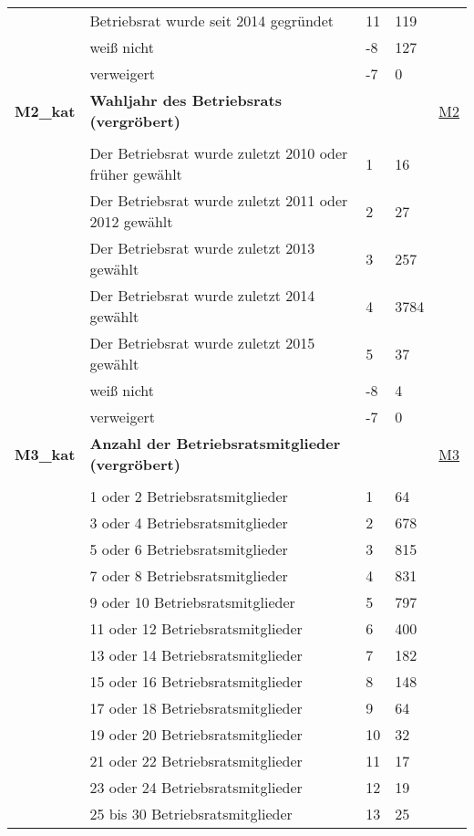 \begin{longtable}{| L{2.5cm} | L{8.25cm}| C{1.5cm} | R{1.25cm} | C{2.25cm} |  }
   & Betriebsrat wurde seit 2014 gegründet & 11 & 119 &  \\ 
   & weiß nicht & -8 & 127 &  \\ 
   & verweigert & -7 & 0 &  \\ 
   \midrule
\textbf{M2\_kat}\label{var:suf:M2:kat} & \textbf{Wahljahr des Betriebsrats (vergröbert)} &  &  & \hyperref[M2]{M2} \\ 
   &  &  &  &  \\ 
   & Der Betriebsrat wurde zuletzt 2010 oder früher gewählt & 1 & 16 &  \\ 
   & Der Betriebsrat wurde zuletzt 2011 oder 2012 gewählt & 2 & 27 &  \\ 
   & Der Betriebsrat wurde zuletzt 2013 gewählt & 3 & 257 &  \\ 
   & Der Betriebsrat wurde zuletzt 2014 gewählt & 4 & 3784 &  \\ 
   & Der Betriebsrat wurde zuletzt 2015 gewählt & 5 & 37 &  \\ 
   & weiß nicht & -8 & 4 &  \\ 
   & verweigert & -7 & 0 &  \\ 
   \midrule
\textbf{M3\_kat}\label{var:suf:M3:kat} & \textbf{Anzahl der Betriebsratsmitglieder (vergröbert)} &  &  & \hyperref[M3]{M3} \\ 
   &  &  &  &  \\ 
   & 1 oder 2 Betriebsratsmitglieder & 1 & 64 &  \\ 
   & 3 oder 4 Betriebsratsmitglieder & 2 & 678 &  \\ 
   & 5 oder 6 Betriebsratsmitglieder & 3 & 815 &  \\ 
   & 7 oder 8 Betriebsratsmitglieder & 4 & 831 &  \\ 
   & 9 oder 10 Betriebsratsmitglieder & 5 & 797 &  \\ 
   & 11 oder 12 Betriebsratsmitglieder & 6 & 400 &  \\ 
   & 13 oder 14 Betriebsratsmitglieder & 7 & 182 &  \\ 
   & 15 oder 16 Betriebsratsmitglieder & 8 & 148 &  \\ 
   & 17 oder 18 Betriebsratsmitglieder & 9 & 64 &  \\ 
   & 19 oder 20 Betriebsratsmitglieder & 10 & 32 &  \\ 
   & 21 oder 22 Betriebsratsmitglieder & 11 & 17 &  \\ 
   & 23 oder 24 Betriebsratsmitglieder & 12 & 19 &  \\ 
   & 25 bis 30 Betriebsratsmitglieder & 13 & 25 &  \\ 

\end{longtable}
